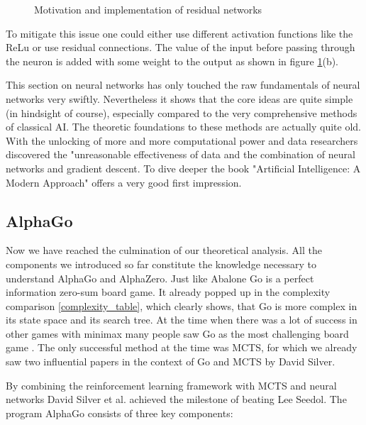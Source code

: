 \begin{figure}[!h]
    \centering
    \caption{Motivation and implementation of residual networks}
    \label{residual_network}
\end{figure}

To mitigate this issue one could either use different activation functions like the ReLu or use residual connections. The value of the input before passing through the neuron is added with some weight to the output as shown in figure \ref{residual_network}(b).

This section on neural networks has only touched the raw fundamentals of neural networks very swiftly. Nevertheless it shows that the core ideas are quite simple (in hindsight of course), especially compared to the very comprehensive methods of classical AI. The theoretic foundations to these methods are actually quite old. With the unlocking of more and more computational power and data researchers discovered the "unreasonable effectiveness of data \cite{halevy_unreasonable_2009} and the combination of neural networks and gradient descent. To dive deeper the book "Artificial Intelligence: A Modern Approach" \cite{russell_artificial_2021} offers a very good first impression.

\subsection{AlphaGo}
Now we have reached the culmination of our theoretical analysis. All the components we introduced so far constitute the knowledge necessary to understand AlphaGo and AlphaZero. Just like Abalone Go is a perfect information zero-sum board game. It already popped up in the complexity comparison \ref{complexity_table}, which clearly shows, that Go is more complex in its state space and its search tree. At the time when there was a lot of success in other games with minimax many people saw Go as the most challenging board game \cite{muller_computer_2002}. The only successful method at the time was MCTS, for which we already saw two influential papers in the context of Go and MCTS by David Silver.

By combining the reinforcement learning framework with MCTS and neural networks David Silver et al. achieved the milestone of beating Lee Seedol. The program AlphaGo consists of three key components:

